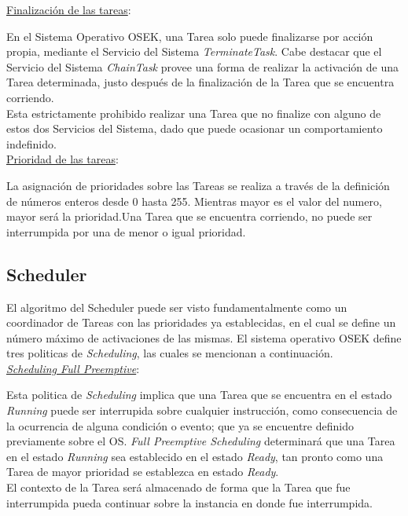 \documentclass[12pt,letterpaper]{article}
\begin{document}
\underline{Finalización de las tareas}:

En el Sistema Operativo OSEK, una Tarea solo puede finalizarse por acción propia, mediante el Servicio del Sistema \textit{TerminateTask}. Cabe destacar que el Servicio del Sistema \textit{ChainTask} provee una forma de realizar la activación de una Tarea determinada, justo después de la finalización de la Tarea que se encuentra corriendo.
 \\
 
Esta estrictamente prohibido realizar una Tarea que no finalize con alguno de estos dos Servicios del Sistema, dado que puede ocasionar un comportamiento indefinido.
 \\
 
\underline{Prioridad de las tareas}:

La asignación de prioridades sobre las Tareas se realiza a través de la definición de números enteros desde 0 hasta 255. Mientras mayor es el valor del numero, mayor será la prioridad.Una Tarea que se encuentra corriendo, no puede ser interrumpida por una de menor o igual prioridad.
\subsection{Scheduler}\label{sec:scheduler}
El algoritmo del Scheduler puede ser visto fundamentalmente como un coordinador de Tareas con las prioridades ya establecidas, en el cual se define un número máximo de activaciones de las mismas. El sistema operativo OSEK define tres politicas de \textit{Scheduling}, las cuales se mencionan a continuación.
 \\
 
\underline{\textit{Scheduling Full Preemptive}}:

Esta politica de \textit{Scheduling} implica que una Tarea que se encuentra en el estado \textit{Running} puede ser interrupida sobre cualquier instrucción, como consecuencia de la ocurrencia de alguna condición o evento; que ya se encuentre definido previamente sobre el OS. \textit{Full Preemptive Scheduling} determinará que una Tarea en el estado \textit{Running} sea establecido en el estado \textit{Ready}, tan pronto como una Tarea de mayor prioridad se establezca en estado \textit{\textit{Ready}}.
 \\
 
El contexto de la Tarea será almacenado de forma que la Tarea que fue interrumpida pueda continuar sobre la instancia en donde fue interrumpida.
 \\
 
\end{document}
